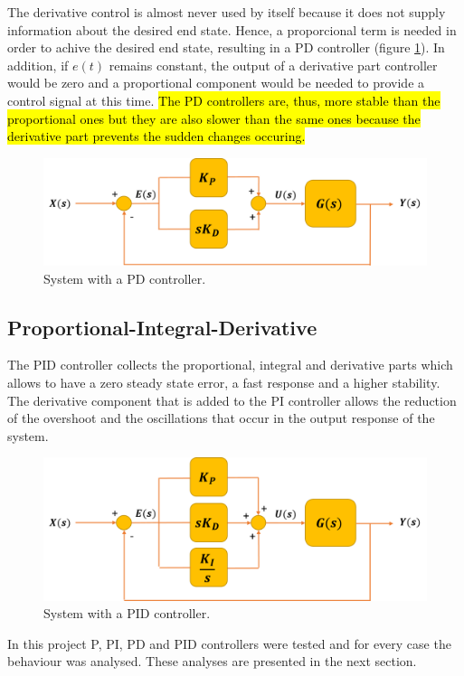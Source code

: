 The derivative control is almost never used by itself because it does not supply information about the desired end state. Hence, a proporcional term is needed in order to achive the desired end state, resulting in a PD controller (figure \ref{PD_controller}). In addition, if $e(t)$ remains constant, the output of a derivative part controller would be zero and a proportional component would be needed to provide a control signal at this time. \hl{The PD controllers are, thus, more stable than the proportional ones but they are also slower than the same ones because the derivative part prevents the sudden changes occuring.}

\begin{figure}[H]
	\centering
	\includegraphics[scale=0.6]{figures/PD_controller.png}
	\caption{System with a PD controller.}
	\label{PD_controller}
\end{figure}

\subsection*{Proportional-Integral-Derivative}

The PID controller collects the proportional, integral and derivative parts which allows to have a zero steady state error, a fast response and a higher stability. The derivative component that is added to the PI controller allows the reduction of the overshoot and the oscillations that occur in the output response of the system. 

\begin{figure}[H]
	\centering
	\includegraphics[scale=0.6]{figures/PID_controller.png}
	\caption{System with a PID controller.}
	\label{PID_controller}
\end{figure}

In this project P, PI, PD and PID controllers were tested and for every case the behaviour was analysed. These analyses are presented in the next section.